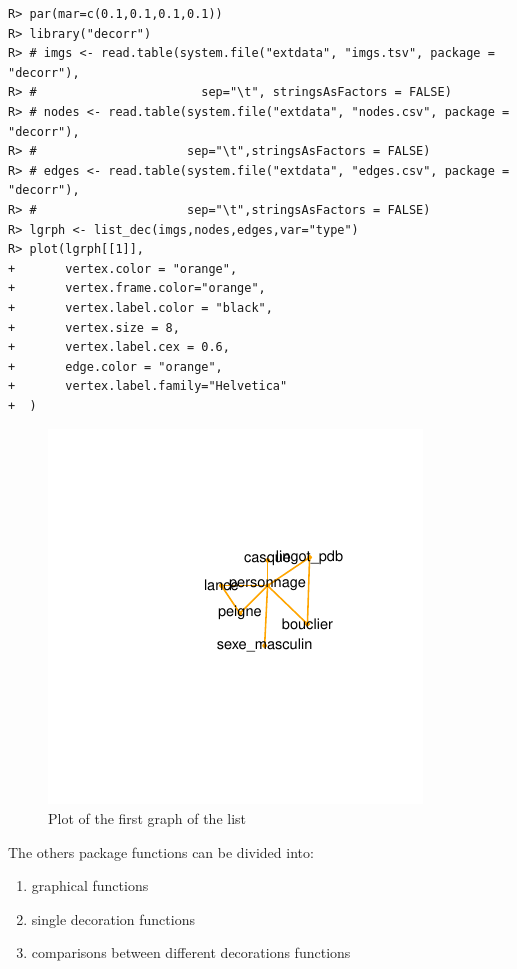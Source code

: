 \documentclass[article]{jss}\usepackage{knitr}
\begin{document}
\begin{kframe}
\begin{verbatim}
R> par(mar=c(0.1,0.1,0.1,0.1))
R> library("decorr")
R> # imgs <- read.table(system.file("extdata", "imgs.tsv", package = "decorr"),
R> #                       sep="\t", stringsAsFactors = FALSE)
R> # nodes <- read.table(system.file("extdata", "nodes.csv", package = "decorr"),
R> #                     sep="\t",stringsAsFactors = FALSE)
R> # edges <- read.table(system.file("extdata", "edges.csv", package = "decorr"),
R> #                     sep="\t",stringsAsFactors = FALSE)
R> lgrph <- list_dec(imgs,nodes,edges,var="type")
R> plot(lgrph[[1]],
+       vertex.color = "orange",
+       vertex.frame.color="orange",
+       vertex.label.color = "black",
+       vertex.size = 8,
+       vertex.label.cex = 0.6,
+       edge.color = "orange",
+       vertex.label.family="Helvetica"
+  )
\end{verbatim}
\end{kframe}\begin{figure}[H]

{\centering \includegraphics[width=\maxwidth]{figure/unnamed-chunk-8-1} 

}

\caption{\label{fig:figs}Plot of the first graph of the list}\label{fig:unnamed-chunk-8}
\end{figure}




The others  package functions can be divided into:
\begin{enumerate}
 \item graphical functions
 \item single decoration functions
 \item comparisons between different decorations functions
\end{enumerate}
\end{document}
